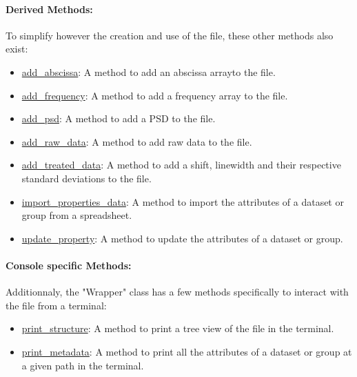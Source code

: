 \paragraph{Derived Methods:} 
To simplify however the creation and use of the file, these other methods also exist:
\begin{itemize}
    \item \hyperref[subsec:wrapper.add_abscissa]{add\_abscissa}: A method to add an abscissa arrayto the file.
    \item \hyperref[subsec:wrapper.add_frequency]{add\_frequency}: A method to add a frequency array to the file.
    \item \hyperref[subsec:wrapper.add_psd]{add\_psd}: A method to add a PSD to the file.
    \item \hyperref[subsec:wrapper.add_raw_data]{add\_raw\_data}: A method to add raw data to the file.
    \item \hyperref[subsec:wrapper.add_treated_data]{add\_treated\_data}: A method to add a shift, linewidth and their respective standard deviations to the file.
    \item \hyperref[subsec:wrapper.import_properties_data]{import\_properties\_data}: A method to import the attributes of a dataset or group from a spreadsheet.
    \item \hyperref[subsec:wrapper.update_property]{update\_property}: A method to update the attributes of a dataset or group.
\end{itemize}

\paragraph{Console specific Methods:} 
Additionnaly, the "Wrapper" class has a few methods specifically to interact with the file from a terminal:
\begin{itemize}
    \item \hyperref[subsec:wrapper.print_structure]{print\_structure}: A method to print a tree view of the file in the terminal.
    \item \hyperref[subsec:wrapper.print_metadata]{print\_metadata}: A method to print all the attributes of a dataset or group at a given path in the terminal.
\end{itemize}

 